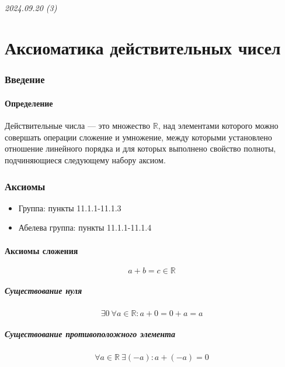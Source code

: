\documentclass{article}
\begin{document}
\newpage
\paragraph{2024.09.20 (3)}
\part{Аксиоматика действительных чисел}

\section{Введение}

\subsection{Определение}
Действительные числа --- это множество $\mathbb{R}$, над элементами которого можно совершать операции сложение и умножение, 
между которыми установлено отношение линейного порядка и для которых выполнено свойство полноты,
подчиняющиеся следующему набору аксиом.



\section{Аксиомы}
\begin{itemize}
    \item Группа: пункты 11.1.1-11.1.3
    \item Абелева группа: пункты 11.1.1-11.1.4
\end{itemize}

\subsection{Аксиомы сложения}
\[
    a + b = c \in \mathbb{R}
\]  

\subsubsection{Существование нуля}
\[
    \exists 0 ~ \forall a \in \mathbb{R}: a + 0 = 0 + a = a
\]

\subsubsection{Существование противоположного элемента}
\[
    \forall a \in \mathbb{R} ~ \exists (-a): a + (-a) = 0
\]
\end{document}

